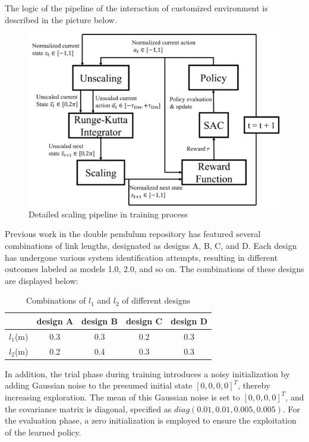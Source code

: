 The logic of the pipeline of the interaction of customized environment is described in the picture below.

\begin{figure}[H]
    \centering
    \includegraphics[width=0.85\linewidth]{figures/simulation_result/scaling_mechanism.png}
    \caption{Detailed scaling pipeline in training process}
    \label{fig:scasling_mech}
\end{figure}

Previous work in the double pendulum repository has featured several combinations of link lengths, designated as designs A, B, C, and D. Each design has undergone various system identification attempts, resulting in different outcomes labeled as models 1.0, 2.0, and so on. The combinations of these designs are displayed below:

\begin{table}[ht]
\centering
\begin{tabular}{|c|c|c|c|c|}
\hline
  & design A & design B & design C & design D \\
\hline
$l_1$(m) & 0.3 & 0.3 & 0.2 & 0.3 \\
\hline
$l_2$(m) & 0.2 & 0.4 & 0.3 & 0.3 \\
\hline
\end{tabular}
\caption{Combinations of $l_1$ and $l_2$ of different designs}
\label{tab:different_designs}
\end{table}

In addition, the trial phase during training introduces a noisy initialization by adding Gaussian noise to the presumed initial state \([0,0,0,0]^T\), thereby increasing exploration. The mean of this Gaussian noise is set to \([0,0,0,0]^T\), and the covariance matrix is diagonal, specified as \(diag(0.01,0.01,0.005,0.005) \). For the evaluation phase, a zero initialization is employed to ensure the exploitation of the learned policy.

